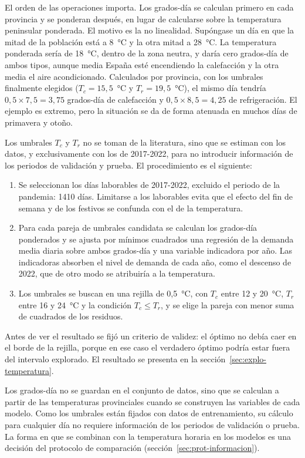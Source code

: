 El orden de las operaciones importa. Los grados-día se calculan primero en
cada provincia y se ponderan después, en lugar de calcularse sobre la
temperatura peninsular ponderada. El motivo es la no linealidad. Supóngase
un día en que la mitad de la población está a 8~°C y la otra mitad a 28~°C.
La temperatura ponderada sería de 18~°C, dentro de la zona neutra, y daría
cero grados-día de ambos tipos, aunque media España esté encendiendo la
calefacción y la otra media el aire acondicionado. Calculados por provincia,
con los umbrales finalmente elegidos ($T_c = 15{,}5$~°C y $T_r = 19{,}5$~°C),
el mismo día tendría $0{,}5 \times 7{,}5 = 3{,}75$ grados-día de calefacción
y $0{,}5 \times 8{,}5 = 4{,}25$ de refrigeración. El ejemplo es extremo, pero
la situación se da de forma atenuada en muchos días de primavera y otoño.

Los umbrales $T_c$ y $T_r$ no se toman de la literatura, sino que se estiman
con los datos, y exclusivamente con los de 2017-2022, para no introducir
información de los periodos de validación y prueba. El procedimiento es el
siguiente:
\begin{enumerate}
	\item Se seleccionan los días laborables de 2017-2022, excluido el periodo
	de la pandemia: 1410 días. Limitarse a los laborables evita que el efecto
	del fin de semana y de los festivos se confunda con el de la temperatura.
	\item Para cada pareja de umbrales candidata se calculan los grados-día
	ponderados y se ajusta por mínimos cuadrados una regresión de la demanda
	media diaria sobre ambos grados-día y una variable indicadora por año. Las
	indicadoras absorben el nivel de demanda de cada año, como el descenso de
	2022, que de otro modo se atribuiría a la temperatura.
	\item Los umbrales se buscan en una rejilla de 0,5~°C, con $T_c$ entre 12
	y 20~°C, $T_r$ entre 16 y 24~°C y la condición $T_c \le T_r$, y se elige la
	pareja con menor suma de cuadrados de los residuos.
\end{enumerate}
Antes de ver el resultado se fijó un criterio de validez: el óptimo no debía
caer en el borde de la rejilla, porque en ese caso el verdadero óptimo podría
estar fuera del intervalo explorado. El resultado se presenta en la
sección~\ref{sec:explo-temperatura}.

Los grados-día no se guardan en el conjunto de datos, sino que se calculan a
partir de las temperaturas provinciales cuando se construyen las variables de
cada modelo. Como los umbrales están fijados con datos de entrenamiento, su
cálculo para cualquier día no requiere información de los periodos de
validación o prueba. La forma en que se combinan con la temperatura horaria
en los modelos es una decisión del protocolo de comparación
(sección~\ref{sec:prot-informacion}).

